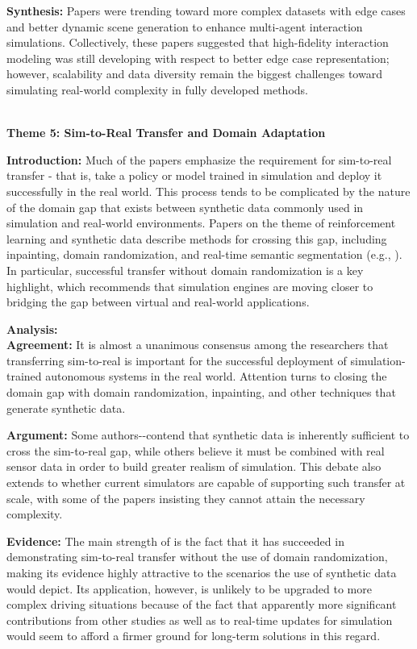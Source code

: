 \documentclass[lettersize,journal]{IEEEtran}
\newcommand{\subsubsubsection}[1]{%
    \par\medskip
    \noindent\textbf{#1}
    \par\medskip
}
\begin{document}
\textbf{Synthesis:}
 Papers were trending toward more complex datasets with edge cases and better dynamic scene generation to enhance multi-agent interaction simulations. Collectively, these papers suggested that high-fidelity interaction modeling was still developing with respect to better edge case representation; however, scalability and data diversity remain the biggest challenges toward simulating real-world complexity in fully developed methods.
\\
\\
\subsubsubsection{Theme 5: Sim-to-Real Transfer and Domain Adaptation}
\textbf{Introduction:}
Much of the papers emphasize the requirement for sim-to-real transfer - that is, take a policy or model trained in simulation and deploy it successfully in the real world. This process tends to be complicated by the nature of the domain gap that exists between synthetic data commonly used in simulation and real-world environments. Papers on the theme of reinforcement learning and synthetic data describe methods for crossing this gap, including inpainting, domain randomization, and real-time semantic segmentation (e.g., \cite{ref10}). In particular, successful transfer without domain randomization \cite{ref5} is a key highlight, which recommends that simulation engines are moving closer to bridging the gap between virtual and real-world applications.

\textbf{Analysis:}  \\
\textbf{Agreement:}
It is almost a unanimous consensus among the researchers that transferring sim-to-real is important for the successful deployment of simulation-trained autonomous systems in the real world. Attention turns to closing the domain gap with domain randomization, inpainting, and other techniques that generate synthetic data.

\textbf{Argument:}
Some authors-\cite{ref5}-contend that synthetic data is inherently sufficient to cross the sim-to-real gap, while others believe it must be combined with real sensor data in order to build greater realism of simulation. This debate also extends to whether current simulators are capable of supporting such transfer at scale, with some of the papers insisting they cannot attain the necessary complexity.


\textbf{Evidence:}
The main strength of \cite{ref5} is the fact that it has succeeded in demonstrating sim-to-real transfer without the use of domain randomization, making its evidence highly attractive to the scenarios the use of synthetic data would depict. Its application, however, is unlikely to be upgraded to more complex driving situations because of the fact that apparently more significant contributions from other studies as well as to real-time updates for simulation would seem to afford a firmer ground for long-term solutions in this regard.
\end{document}
